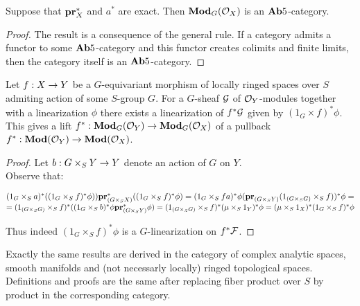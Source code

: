 \begin{corollary}
Suppose that $\mathbf{pr}^*_X$ and $a^*$ are exact. Then $\mathbf{Mod}_G({\mathcal O}_X)$ is an $\mathbf{Ab}5$-category.
\end{corollary}
\begin{proof}
The result is a consequence of the general rule. If a category admits a functor to some $\mathbf{Ab}5$-category and this functor creates colimits and finite limits, then the  category itself is an $\mathbf{Ab}5$-category.
\end{proof}

\begin{proposition}
Let $f:X\rightarrow Y$ be a $G$-equivariant morphism of locally ringed spaces over $S$ admiting action of some $S$-group $G$. For a $G$-sheaf ${\mathcal G}$ of ${\mathcal O}_Y$-modules together with a linearization $\phi$ there exists a linearization of $f^*{\mathcal G}$ given by $(1_G\times f)^*\phi$. This gives a lift $f^*:\mathbf{Mod}_G({\mathcal O}_Y)\rightarrow \mathbf{Mod}_G({\mathcal O}_X)$ of a pullback $f^*:\mathbf{Mod}({\mathcal O}_Y)\rightarrow \mathbf{Mod}({\mathcal O}_X)$.
\end{proposition}
\begin{proof}
Let $b:G\times_SY\rightarrow Y$ denote an action of $G$ on $Y$.\\
Observe that:
\begin{center}
$(1_G\times_Sa)^*((1_G\times_Sf)^*\phi))\mathbf{pr}_{(G\times_SX)}^*((1_G\times_Sf)^*\phi)=(1_G\times_Sfa)^*\phi (\mathbf{pr}_{(G\times_SY)}(1_{(G\times_SG)}\times_Sf))^*\phi=$\\$=(1_{(G\times_SG)}\times_Sf)^*((1_G\times_Sb)^*\phi \mathbf{pr}_{(G\times_SY)}^*\phi)=(1_{(G\times_SG)}\times_Sf)^*(\mu\times_S1_Y)^*\phi=(\mu\times_S1_X)^*(1_G\times_Sf)^*\phi$
\end{center}
Thus indeed $(1_G\times_Sf)^*\phi$ is a $G$-linearization on $f^*{\mathcal F}$. 
\end{proof}

\begin{remark}
Exactly the same results are derived in the category of complex analytic spaces, smooth manifolds and (not necessarly locally) ringed topological spaces. Definitions and proofs are the same after replacing fiber product over $S$ by product in the corresponding category.
\end{remark}






\small




